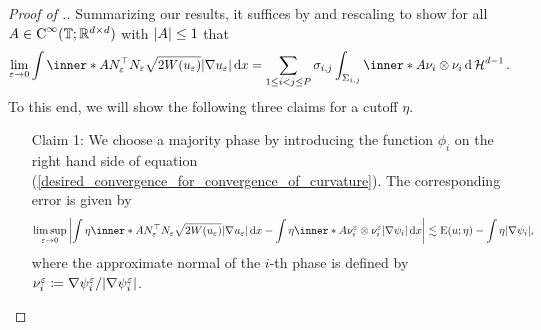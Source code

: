 \begin{proof}[Proof of .]
	Summarizing our results, it suffices by  and rescaling to show for all $ A \in \operatorname{C}^{ \infty } ( \operatorname{\mathbb{T}} ; \mathbb{ R }^{ d \times d } ) $ with $ \abs{ A } \leq 1 $ that
	\begin{equation}
		\label{desired_convergence_for_convergence_of_curvature}
		\lim_{ \varepsilon \to 0 }
			\int
				\inner*{ A }{ N_{ \varepsilon }^{ \top } N_{ \varepsilon } }
				\sqrt{ 2 W ( u_{ \varepsilon } ) }
				\abs{ \nabla u_{ \varepsilon } }
			\dd{ x }
		=
		\sum_{ 1 \leq i < j \leq P }
			\sigma_{ i , j }
			\int_{ \Sigma_{ i , j } }
				\inner*{ A }{ \nu_{ i } \otimes \nu_{ i } }
			\dd{ \hm^{ d - 1 } }.
	\end{equation}
	To this end, we will show the following three claims for a cutoff $ \eta $.
	\begin{itemize}[wide=0pt]
		\item[Claim 1:]
		We choose a majority phase by introducing the function $ \phi_{ i } $ on the right hand side of equation (\ref{desired_convergence_for_convergence_of_curvature}). The corresponding error is given by
		\begin{equation*}
			\limsup_{ \varepsilon \to 0 }
				\abs{ 
					\int
						\eta 
						\inner*{ A }{ N_{ \varepsilon }^{ \top } N_{ \varepsilon } }
						\sqrt{ 2 W ( u_{ \varepsilon } ) } \abs{ \nabla u_{ \varepsilon } } 
					\dd{ x }
					-
					\int
						\eta
						\inner*{ A }{ \nu_{ i }^{ \varepsilon } \otimes \nu_{ i }^{ \varepsilon } }
						\abs{ \nabla \psi_{ i } }
					\dd{ x }
				}
			\lesssim
				\energy ( u ; \eta ) 
				-
				\int
					\eta
				\abs{ \nabla \psi_{ i } },
		\end{equation*}
		where the approximate normal of the $ i$-th phase is defined by $ \nu_{ i }^{ \varepsilon } \coloneqq \nabla \psi_{ i }^{ \varepsilon } / \abs{ \nabla \psi_{ i }^{ \varepsilon } } $.
		

\end{itemize}
\end{proof}
